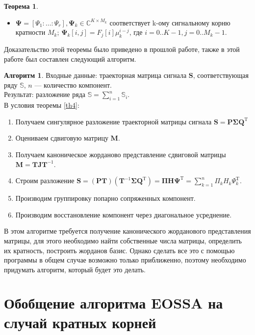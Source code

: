 \documentclass[specialist, substylefile = spbureport.rtx, subf,href,colorlinks=true, 12pt]{disser}
\theoremstyle{definition}
\newtheorem{algorithm}{Алгоритм}
\newtheorem{theorem}{Теорема}
\begin{document}
\begin{theorem}
\begin{enumerate}
\begin{itemize}
            \item $\mathbf{\Psi} = [\Psi_1: \ldots :\Psi_r], \mathbf{\Psi}_k \in \mathbb{C}^{K \times M_k}$ соответствует k-ому сигнальному корню кратности $M_k$; $\mathbf{\Psi}_k[i, j] = F_j[i]\mu_k^{i - j}$, где $i = 0..K-1, j = 0..M_k-1$.
        \end{itemize}
    \end{enumerate}

\end{theorem}

Доказательство этой теоремы было приведено в прошлой работе, также в этой работе был составлен следующий алгоритм.

\begin{algorithm}
Входные данные: траекторная матрица сигнала $\mathbf{S}$, соответствующая ряду $\mathbb{S}$, $n$ --- количество компонент.\\
Результат: разложение ряда $\mathbb{S} = \sum_{i = 1}^{n}\mathbb{S}_i$.\\
 В условия теоремы \ref{th4}:
\begin{enumerate}
            \item Получаем сингулярное разложение траекторной матрицы сигнала $\mathbf{S} = \mathbf{P\Sigma Q}^{\mathrm{T}}$
            \item Оцениваем сдвиговую матрицу $\mathbf{M}$.
            \item Получаем каноническое жорданово представление сдвиговой матрицы $\mathbf{M} = \mathbf{TJ}\mathbf{T}^{-1}$.
            \item Строим разложение $\mathbf{S} = (\mathbf{PT})(\mathbf{T}^{-1}\mathbf{\Sigma Q}^{\mathrm{T}}) = \mathbf{\Pi H \Psi}^{\mathrm{T}} = \sum_{k = 1}^{n}\Pi_k H_k\Psi^{\mathrm{T}}_k$.
            \item Производим группировку попарно сопряженных компонент.
            \item Производим восстановление компонент через диагональное усреднение.
        \end{enumerate}
\end{algorithm}

В этом алгоритме требуется получение канонического жорданового представления матрицы, для этого необходимо найти собственные числа матрицы, определить их кратность, построить жорданов базис. Однако сделать все это с помощью программы в общем случае возможно только приближенно, поэтому необходимо придумать алгоритм, который будет это делать.
\chapter{Обобщение алгоритма EOSSA на случай кратных корней}
\end{document}
